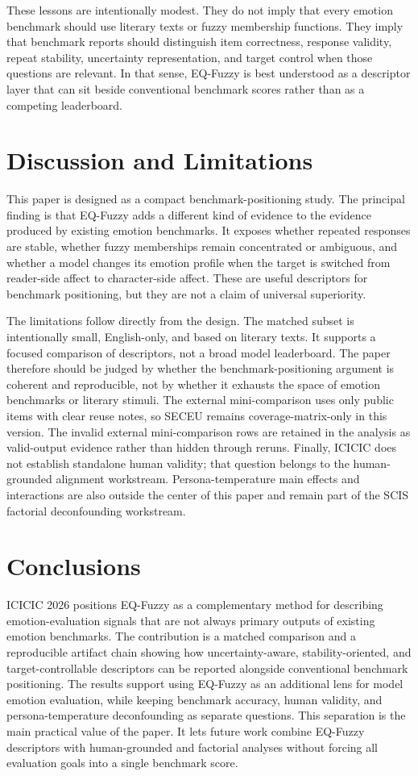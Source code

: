 \documentclass[12pt,a4paper]{icicel}
\begin{document}
These lessons are intentionally modest.
They do not imply that every emotion benchmark should use literary texts or
fuzzy membership functions.
They imply that benchmark reports should distinguish item correctness,
response validity, repeat stability, uncertainty representation, and target
control when those questions are relevant.
In that sense, EQ-Fuzzy is best understood as a descriptor layer that can sit
beside conventional benchmark scores rather than as a competing leaderboard.

\section{Discussion and Limitations}
This paper is designed as a compact benchmark-positioning study.
The principal finding is that EQ-Fuzzy adds a different kind of evidence to
the evidence produced by existing emotion benchmarks.
It exposes whether repeated responses are stable, whether fuzzy memberships
remain concentrated or ambiguous, and whether a model changes its emotion
profile when the target is switched from reader-side affect to character-side
affect.
These are useful descriptors for benchmark positioning, but they are not a
claim of universal superiority.

The limitations follow directly from the design.
The matched subset is intentionally small, English-only, and based on literary
texts.
It supports a focused comparison of descriptors, not a broad model leaderboard.
The paper therefore should be judged by whether the benchmark-positioning
argument is coherent and reproducible, not by whether it exhausts the space of
emotion benchmarks or literary stimuli.
The external mini-comparison uses only public items with clear reuse notes, so
SECEU remains coverage-matrix-only in this version.
The invalid external mini-comparison rows are retained in the analysis as
valid-output evidence rather than hidden through reruns.
Finally, ICICIC does not establish standalone human validity; that question
belongs to the human-grounded alignment workstream.
Persona-temperature main effects and interactions are also outside the center
of this paper and remain part of the SCIS factorial deconfounding workstream.

\section{Conclusions}
ICICIC 2026 positions EQ-Fuzzy as a complementary method for describing
emotion-evaluation signals that are not always primary outputs of existing
emotion benchmarks.
The contribution is a matched comparison and a reproducible artifact chain
showing how uncertainty-aware, stability-oriented, and target-controllable
descriptors can be reported alongside conventional benchmark positioning.
The results support using EQ-Fuzzy as an additional lens for model emotion
evaluation, while keeping benchmark accuracy, human validity, and
persona-temperature deconfounding as separate questions.
This separation is the main practical value of the paper.
It lets future work combine EQ-Fuzzy descriptors with human-grounded and
factorial analyses without forcing all evaluation goals into a single
benchmark score.
\end{document}
